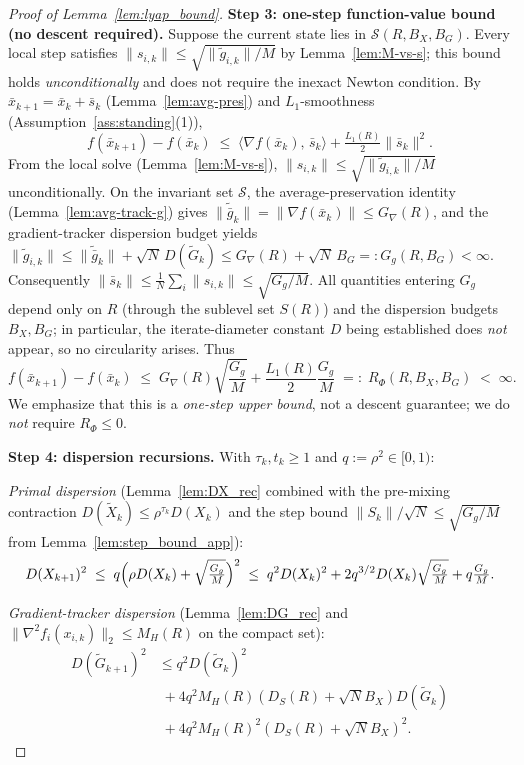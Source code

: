 \documentclass[10pt,twocolumn,letterpaper]{article}
\theoremstyle{compact}
\theoremstyle{compactremark}
\begin{document}
\begin{proof}[Proof of Lemma~\ref{lem:lyap_bound}]
\vspace{1pt}
\noindent\textbf{Step 3: one-step function-value bound (no descent required).}
Suppose the current state lies in $\mathcal S(R,B_X,B_G)$.
Every local step satisfies $\|s_{i,k}\|\le\sqrt{\|\tilde g_{i,k}\|/M}$
by Lemma~\ref{lem:M-vs-s}; this bound holds \emph{unconditionally}
and does not require the inexact Newton condition.
By $\bar x_{k+1}=\bar x_k+\bar s_k$ (Lemma~\ref{lem:avg-pres}) and
$L_1$-smoothness (Assumption~\ref{ass:standing}(1)),
\[
  f(\bar x_{k+1})-f(\bar x_k)
  \;\le\;
  \langle \nabla f(\bar x_k),\,\bar s_k\rangle
  +\tfrac{L_1(R)}{2}\|\bar s_k\|^2.
\]
From the local solve (Lemma~\ref{lem:M-vs-s}),
$\|s_{i,k}\|\le\sqrt{\|\tilde g_{i,k}\|/M}$ unconditionally.
On the invariant set $\mathcal S$, the average-preservation identity
(Lemma~\ref{lem:avg-track-g}) gives
$\|\tilde{\bar g}_k\|=\|\nabla f(\bar x_k)\|\le G_\nabla(R)$,
and the gradient-tracker dispersion budget yields
$\|\tilde g_{i,k}\|\le \|\tilde{\bar g}_k\|+\sqrt{N}\,D(\tilde G_k)
\le G_\nabla(R)+\sqrt{N}\,B_G=:G_g(R,B_G)<\infty$.
Consequently $\|\bar s_k\|\le\frac{1}{N}\sum_i\|s_{i,k}\|
\le\sqrt{G_g/M}$.
All quantities entering $G_g$ depend only on $R$ (through the
sublevel set $S(R)$) and the dispersion budgets $B_X,B_G$;
in particular, the iterate-diameter constant $D$ being established
does \emph{not} appear, so no circularity arises.
Thus
\begin{equation}\label{eq:rphi_R}
  f(\bar x_{k+1})-f(\bar x_k)
  \;\le\;
  G_\nabla(R)\sqrt{\frac{G_g}{M}}+\frac{L_1(R)}{2}\frac{G_g}{M}
  \;=:\; R_\Phi(R,B_X,B_G) \;<\;\infty.
\end{equation}
We emphasize that this is a \emph{one-step upper bound}, not a descent
guarantee; we do \emph{not} require $R_\Phi\le 0$.

\vspace{1pt}
\noindent\textbf{Step 4: dispersion recursions.}
With $\tau_k,t_k\ge1$ and $q:=\rho^2\in[0,1)$:

\emph{Primal dispersion} (Lemma~\ref{lem:DX_rec} combined with the
pre-mixing contraction $D(\tilde X_k)\le \rho^{\tau_k}D(X_k)$ and the
step bound $\|S_k\|/\sqrt{N}\le \sqrt{G_g/M}$ from
Lemma~\ref{lem:step_bound_app}):
\[
  D(X_{k+1})^2
  \;\le\; q\Bigl(\rho D(X_k)+\sqrt{\tfrac{G_g}{M}}\Bigr)^2
  \;\le\; q^2 D(X_k)^2 + 2q^{3/2}D(X_k)\sqrt{\tfrac{G_g}{M}}+q\tfrac{G_g}{M}.
\]

\emph{Gradient-tracker dispersion} (Lemma~\ref{lem:DG_rec}
and $\|\nabla^2 f_i(x_{i,k})\|_2\le M_H(R)$ on the compact set):
\begin{align*}
  D(\tilde G_{k+1})^2
  &\le q^2 D(\tilde G_k)^2\\
  &\;+ 4q^2 M_H(R)(D_S(R){+}\sqrt{N}B_X)D(\tilde G_k)\\
  &\;+ 4q^2 M_H(R)^2(D_S(R){+}\sqrt{N}B_X)^2.
\end{align*}


\end{proof}
\end{document}
